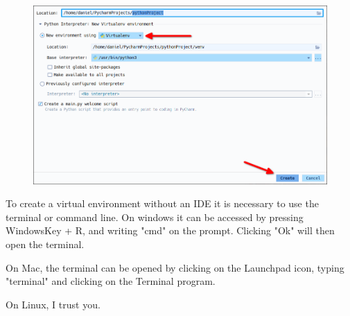 \documentclass[a4paper,12pt]{article}
\begin{document}
\begin{figure}[!ht]
    \begin{center}
        \includegraphics[scale=0.5]{pycharm-create.png}
    \end{center}
\end{figure}

To create a virtual environment without an IDE it is necessary to use the terminal or command line. On windows it can be accessed by pressing WindowsKey + R, and writing "cmd" on the prompt. Clicking "Ok" will then open the terminal.

On Mac, the terminal can be opened by clicking on the Launchpad icon, typing "terminal" and clicking on the Terminal program.

On Linux, I trust you.
\end{document}

